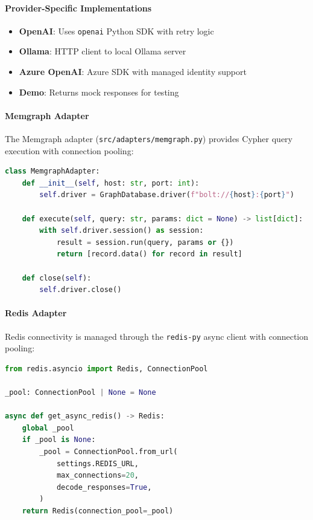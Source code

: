 \paragraph{Provider-Specific Implementations}
\begin{itemize}
    \item \textbf{OpenAI}: Uses \texttt{openai} Python SDK with retry logic
    \item \textbf{Ollama}: HTTP client to local Ollama server
    \item \textbf{Azure OpenAI}: Azure SDK with managed identity support
    \item \textbf{Demo}: Returns mock responses for testing
\end{itemize}

\paragraph{Memgraph Adapter}
The Memgraph adapter (\texttt{src/adapters/memgraph.py}) provides Cypher query execution with connection pooling:

\begin{lstlisting}[language=Python, caption={Memgraph adapter interface.}]
class MemgraphAdapter:
    def __init__(self, host: str, port: int):
        self.driver = GraphDatabase.driver(f"bolt://{host}:{port}")
    
    def execute(self, query: str, params: dict = None) -> list[dict]:
        with self.driver.session() as session:
            result = session.run(query, params or {})
            return [record.data() for record in result]
    
    def close(self):
        self.driver.close()
\end{lstlisting}

\paragraph{Redis Adapter}
Redis connectivity is managed through the \texttt{redis-py} async client with connection pooling:

\begin{lstlisting}[language=Python, caption={Async Redis client initialization.}]
from redis.asyncio import Redis, ConnectionPool

_pool: ConnectionPool | None = None

async def get_async_redis() -> Redis:
    global _pool
    if _pool is None:
        _pool = ConnectionPool.from_url(
            settings.REDIS_URL,
            max_connections=20,
            decode_responses=True,
        )
    return Redis(connection_pool=_pool)
\end{lstlisting}
